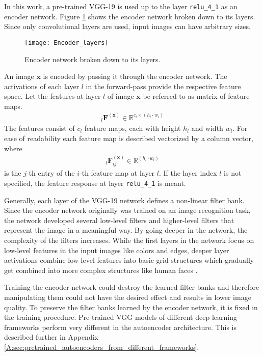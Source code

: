 In this work, a pre-trained VGG-19 is used up to the layer \texttt{relu\_4\_1} as an encoder network. 
Figure \ref{fig:encoder_network_layers} shows the encoder network broken down to its layers. Since only convolutional layers are used, input images can have arbitrary sizes.
\begin{figure}[!ht]
	\centering
  	\texttt{[image: Encoder\_layers]}
	\caption{Encoder network broken down to its layers.}
	\label{fig:encoder_network_layers}
\end{figure}

An image $\mathbf{x}$ is encoded by passing it through the encoder network. The activations of each layer $l$ in the forward-pass provide the respective feature space. Let the features at layer $l$ of image $\mathbf{x}$ be referred to as matrix of feature maps.
\begin{align*}
{}_l
\mathbf{F}^{(\mathbf{x})} 
\in 
\mathbb{R}^{c_l \times (h_l \cdot w_l)}
\end{align*}
The features consist of $c_l$ feature maps, each with height $h_l$ and width $w_l$. For ease of readability each feature map is described vectorized by a column vector, where 
\begin{align*}
{}_l
\mathbf{F}^{(\mathbf{x})}_{ij}
\in 
\mathbb{R}^{(h_l \cdot w_l)}
\end{align*}
is the $j$-th entry of the $i$-th feature map at layer $l$. If the layer index $l$ is not specified, the feature response at layer \texttt{relu\_4\_1} is meant.

Generally, each layer of the VGG-19 network defines a non-linear filter bank. Since the encoder network originally was trained on an image recognition task, the network developed several low-level filters and higher-level filters that represent the image in a meaningful way. By going deeper in the network, the complexity of the filters increases. While the first layers in the network focus on low-level features in the input images like colors and edges, deeper layer activations combine low-level features into basic grid-structures which gradually get combined into more complex structures like human faces \cite{Gatys_2016_CVPR}.

Training the encoder network could destroy the learned filter banks and therefore manipulating them could not have the desired effect and results in lower image quality. To preserve the filter banks learned by the encoder network, it is fixed in the training procedure. Pre-trained VGG models of different deep learning frameworks perform very different in the autoencoder architecture. This is described further in Appendix \ref{A:sec:pretrained_autoencoders_from_different_frameworks}.

